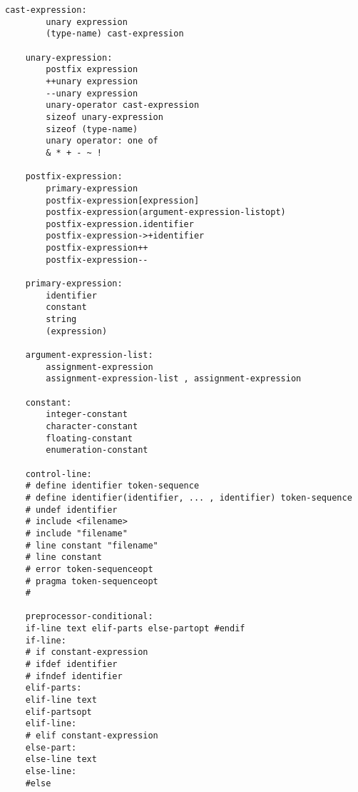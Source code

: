 \begin{lstlisting}[basicstyle=\ttfamily\normalsize\itshape, keywordstyle=\color{black}, stringstyle=\color{black}]
	cast-expression:
		unary expression
		(type-name) cast-expression

	unary-expression:
		postfix expression
		++unary expression
		--unary expression
		unary-operator cast-expression
		sizeof unary-expression
		sizeof (type-name)
		unary operator: one of
		& * + - ~ !

	postfix-expression:
		primary-expression
		postfix-expression[expression]
		postfix-expression(argument-expression-listopt)
		postfix-expression.identifier
		postfix-expression->+identifier
		postfix-expression++
		postfix-expression--

	primary-expression:
		identifier
		constant
		string
		(expression)

	argument-expression-list:
		assignment-expression
		assignment-expression-list , assignment-expression

	constant:
		integer-constant
		character-constant
		floating-constant
		enumeration-constant

	control-line:
	# define identifier token-sequence
	# define identifier(identifier, ... , identifier) token-sequence
	# undef identifier
	# include <filename>
	# include "filename"
	# line constant "filename"
	# line constant
	# error token-sequenceopt
	# pragma token-sequenceopt
	#

	preprocessor-conditional:
	if-line text elif-parts else-partopt #endif
	if-line:
	# if constant-expression
	# ifdef identifier
	# ifndef identifier
	elif-parts:
	elif-line text
	elif-partsopt
	elif-line:
	# elif constant-expression
	else-part:
	else-line text
	else-line:
	#else
\end{lstlisting}

